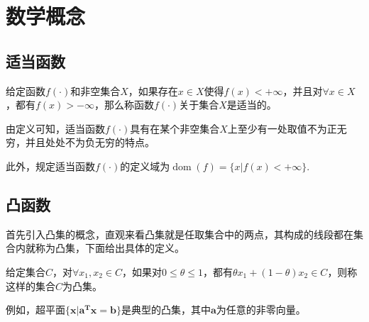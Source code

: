 \section{数学概念}

\subsection{适当函数}
\begin{definition}
    给定函数$f(\cdot)$和非空集合$X$，如果存在$x\in X$使得$f(x)< +\infty$，并且对$\forall x \in X$，都有$f(x) > -\infty$，那么称函数$f(\cdot)$关于集合$X$是适当的。
\end{definition}

由定义可知，适当函数$f(\cdot)$具有在某个非空集合$X$上至少有一处取值不为正无穷，并且处处不为负无穷的特点。

此外，规定适当函数$f(\cdot)$的定义域为$\mathop{\mathrm{dom}} (f) = \{x | f(x) < +\infty\}$.

\subsection{凸函数}
首先引入凸集的概念，直观来看凸集就是任取集合中的两点，其构成的线段都在集合内就称为凸集，下面给出具体的定义。

\begin{definition}
    给定集合$C$，对$\forall x_{1}, x_{2}\in C$，如果对$0 \leq \theta \leq 1$，都有$\theta x_{1}+(1-\theta)x_{2}\in C$，则称这样的集合$C$为凸集。
\end{definition}

例如，超平面$\{\bm{x}|\bm{a^{T}}\bm{x}=\bm{b}\}$是典型的凸集，其中$\bm{a}$为任意的非零向量。

